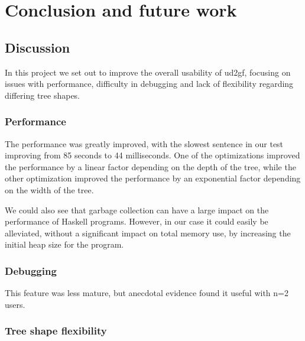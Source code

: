 \chapter{Conclusion and future work}


\section{Discussion}


In this project we set out to improve the overall usability of ud2gf, focusing on issues with performance, difficulty in debugging and lack of flexibility regarding differing tree shapes. 

\subsection{Performance}

The performance was greatly improved, with the slowest sentence in our test improving from 85 seconds to 44 milliseconds. One of the optimizations improved the performance by a linear factor depending on the depth of the tree, while the other optimization improved the performance by an exponential factor depending on the width of the tree.

We could also see that garbage collection can have a large impact on the performance of Haskell programs. However, in our case it could easily be alleviated, without a significant impact on total memory use, by increasing the initial heap size for the program.


\subsection{Debugging}

This feature was less mature, but anecdotal evidence found it useful with n=2 users.

\subsection{Tree shape flexibility}

